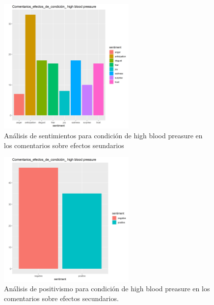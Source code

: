 \documentclass[spanish,]{article}
\begin{document}
\begin{figure}[h]
    \centering
    \includegraphics[width=0.6\textwidth]{figuras/sentimientos/Bblood1.png}
    \caption{Análisis de sentimientos para condición de high blood preasure en los comentarios sobre efectos seundarios}
    \label{fig:sentimientos:15}
\end{figure}

\begin{figure}[h]
    \centering
    \includegraphics[width=0.6\textwidth]{figuras/sentimientos/Bblood2.png}
    \caption{Análisis de positivismo para condición de high blood preasure en los comentarios sobre efectos secundarios.}
    \label{fig:sentimientos:16}
\end{figure}
\end{document}
